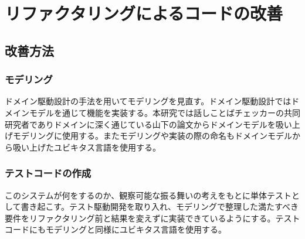 \documentclass[11pt, a4paper]{jreport}
\begin{document}
\chapter{リファクタリングによるコードの改善}
\section{改善方法}
\subsection{モデリング}
ドメイン駆動設計の手法を用いてモデリングを見直す。ドメイン駆動設計ではドメインモデルを通じて機能を実装する。本研究では話しことばチェッカーの共同研究者でありドメインに深く通じている山下の論文からドメインモデルを吸い上げモデリングに使用する。またモデリングや実装の際の命名もドメインモデルから吸い上げたユビキタス言語を使用する。
\subsection{テストコードの作成}
このシステムが何をするのか、観察可能な振る舞いの考えをもとに単体テストとして書き起こす。テスト駆動開発を取り入れ、モデリングで整理した満たすべき要件をリファクタリング前と結果を変えずに実装できているようにする。テストコードにもモデリングと同様にユビキタス言語を使用する。
\end{document}
